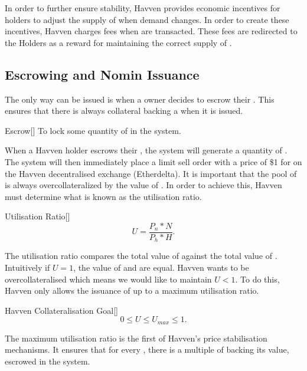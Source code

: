 \noindent In order to further ensure stability, Havven provides economic incentives for \HAV{} holders to adjust the supply of \NOM{} when demand changes. In order to create these incentives, Havven charges fees when \NOM{} are transacted. These fees are redirected to the \HAV{} Holders as a reward for maintaining the correct supply of \NOM{} . \\

\newpage

\subsection{Escrowing and Nomin Issuance} The only way \NOM{} can be issued is when a \HAV{} owner decides to escrow their \HAV{}. This ensures that there is always collateral backing a \NOM{} when it is issued. \\

\begin{namedthm}{Escrow}[]
To lock some quantity of \HAV{} in the system.
\end{namedthm}

\noindent When a Havven holder escrows their \HAV{}, the system will generate a quantity of \NOM{}. The system will then immediately place a limit sell order with a price of \$1 for on the Havven decentralised exchange (Etherdelta). It is important that the pool of \NOM{} is always overcollateralized by the value of \HAV{}. In order to achieve this, Havven must determine what is known as the utilisation ratio. \\

\begin{namedthm}{Utilisation Ratio}[]
$$ U = \frac{P_n * N}{P_h * H}. $$
\end{namedthm}

\noindent The utilisation ratio compares the total value of \NOM{} against the total value of \HAV{}. Intuitively if $U = 1$, the value of \NOM{} and \HAV{} are equal. Havven wants to be overcollateralised which means we would like to maintain $U <  1$. To do this, Havven only allows the issuance of \NOM{} up to a maximum utilisation ratio. \\

\begin{namedthm}{Havven Collateralisation Goal}[]
$$ 0 \leq U \leq U_{max} \leq 1.$$
\end{namedthm}

\noindent The maximum utilisation ratio is the first of Havven's price stabilisation mechanisms. It ensures that for every \NOM{}, there is a multiple of \HAV{} backing its value, escrowed in the system. \\

